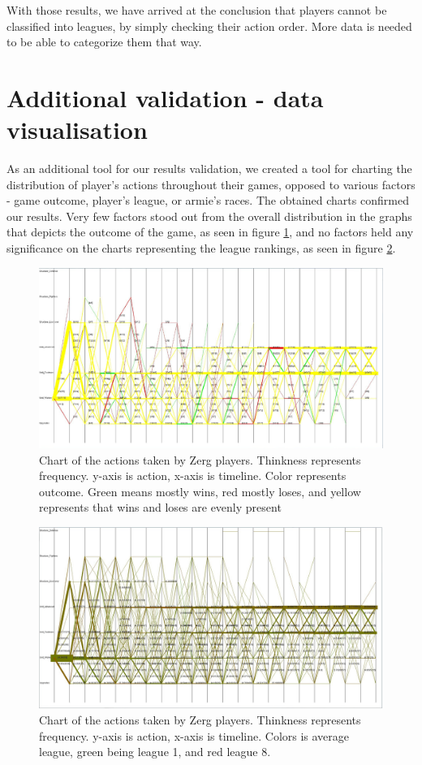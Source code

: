 \documentclass[a4paper,11pt]{article}
\begin{document}
With those results, we have arrived at the conclusion that players cannot be classified into leagues, by simply checking their action order. More data is needed to be able to categorize them that way.

\section{Additional validation - data visualisation}
As an additional tool for our results validation, we created a tool for charting the distribution of player’s actions throughout their games, opposed to various factors - game outcome, player’s league, or armie’s races.
The obtained charts confirmed our results. Very few factors stood out from the overall distribution in the graphs that depicts the outcome of the game, as seen in figure \ref{fig:sequence_win_zerg}, and no factors held any significance on the charts representing the league rankings, as seen in figure \ref{fig:sequence_league}. 
\begin{figure}[H]
\centering
  \includegraphics[width=.95\linewidth]{sequence_win_zerg}
\caption{Chart of the actions taken by Zerg players. Thinkness represents frequency. y-axis is action, x-axis is timeline. Color represents outcome. Green means mostly wins, red mostly loses, and yellow represents that wins and loses are evenly present}
\label{fig:sequence_win_zerg}
\end{figure}

\begin{figure}[H]
\centering
  \includegraphics[width=.95\linewidth]{sequence_league}
\caption{Chart of the actions taken by Zerg players. Thinkness represents frequency. y-axis is action, x-axis is timeline. Colors is average league, green being league 1, and red league 8. }
\label{fig:sequence_league}
\end{figure}
\end{document}
